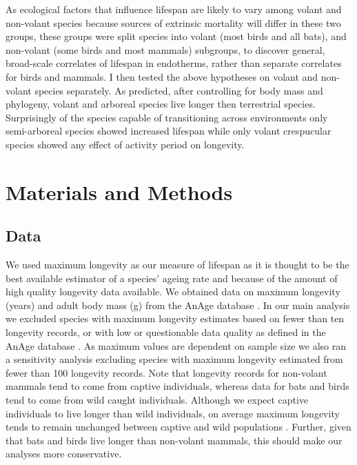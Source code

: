 As ecological factors that influence lifespan are likely to vary among volant and non-volant species because sources of extrinsic mortality will differ in these two groups, these groups were split species into volant (most birds and all bats), and non-volant (some birds and most mammals) subgroups, to discover general, broad-scale correlates of lifespan in endotherms, rather than separate correlates for birds and mammals. I then tested the above hypotheses on volant and non-volant species separately. As predicted, after controlling for body mass and phylogeny, volant and arboreal species live longer then terrestrial species. Surprisingly of the species capable of transitioning across environments only semi-arboreal species showed increased lifespan while only volant crespucular species showed any effect of activity period on longevity.

\section{Materials and Methods}
\subsection{Data}

We used maximum longevity as our measure of lifespan as it is thought to be the best available estimator of a species' ageing rate \citep{de2007analysis} and because of the amount of high quality longevity data available. We obtained data on maximum longevity (years) and adult body mass (g) from the AnAge database \citep{de2009database,tacutu2012human}. In our main analysis we excluded species with maximum longevity estimates based on fewer than ten longevity records, or with low or questionable data quality as defined in the AnAge database \citep{de2007analysis}. As maximum values are dependent on sample size we also ran a sensitivity analysis excluding species with maximum longevity estimated from fewer than 100 longevity records. Note that longevity records for non-volant mammals tend to come from captive individuals, whereas data for bats and birds tend to come from wild caught individuals. Although we expect captive individuals to live longer than wild individuals, on average maximum longevity tends to remain unchanged between captive and wild populations \cite{ricklefs2001comparison}. Further, given that bats and birds live longer than non-volant mammals, this should make our analyses more conservative. 

